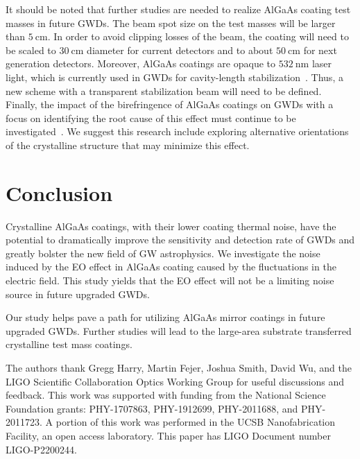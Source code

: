 \documentclass[%
 reprint,
 superscriptaddress,
 amsmath,amssymb,
 aps,
]{revtex4-2}
\newcommand{\unit}[1]{\ \mathrm{#1}}
\begin{document}
It should be noted that further studies are needed to realize AlGaAs coating test masses in future GWDs.
The beam spot size on the test masses will be larger than $5\unit{cm}$.
In order to avoid clipping losses of the beam, the coating will need to be scaled to $30\unit{cm}$ diameter for current detectors and to about $50\unit{cm}$ for next generation detectors.
Moreover, AlGaAs coatings are opaque to $532\unit{nm}$ laser light, which is currently used in GWDs for cavity-length stabilization~\cite{Izumi2012, Staley2014}.
Thus, a new scheme with a transparent stabilization beam will need to be defined.
Finally, the impact of the birefringence of AlGaAs coatings on GWDs with a focus on identifying the root cause of this effect must continue to be investigated~\cite{Winkler2021, Michimura2022, Yu2022}.
We suggest this research include exploring alternative orientations of the crystalline structure that may minimize this effect.


\section{Conclusion}

Crystalline AlGaAs coatings, with their lower coating thermal noise, have the potential to dramatically  improve the sensitivity and detection rate of GWDs and greatly bolster the new field of GW astrophysics.
We investigate the noise induced by the EO effect in AlGaAs coating caused by the fluctuations in the electric field.
This study yields that the EO effect will not be a limiting noise source in future upgraded GWDs.

Our study helps pave a path for utilizing AlGaAs mirror coatings in future upgraded GWDs.
Further studies will lead to the large-area substrate transferred crystalline test mass coatings.

\begin{acknowledgments}
The authors thank Gregg Harry, Martin Fejer, Joshua Smith, David Wu, and the LIGO Scientific Collaboration Optics Working Group for useful discussions and feedback.
This work was supported with funding from the National Science Foundation grants:  PHY-1707863, PHY-1912699, PHY-2011688, and PHY-2011723. 
A portion of this work was performed in the UCSB Nanofabrication Facility, an open access laboratory.
This paper has LIGO Document number LIGO-P2200244.

\end{acknowledgments}





\nocite{*}

\end{document}
